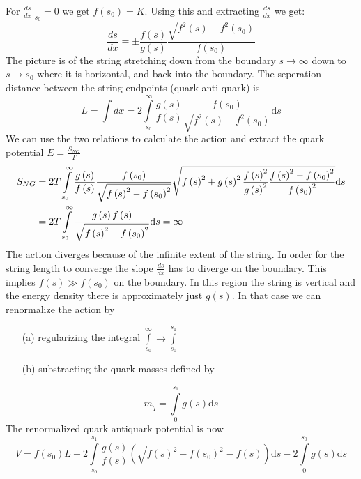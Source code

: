 \documentclass[11pt,a4paper]{article}
\begin{document}
For $\frac{ds}{dx}|_{s_0}=0$ we get $f\left(s_0\right)=K$. Using this and extracting $\frac{ds}{dx}$ we get:
\begin{equation}
\frac{ds}{dx}=\pm\frac{f\left(s\right)}{g\left(s\right)} \frac{\sqrt{f^2\left(s\right)-f^2\left(s_0\right)}}{f\left(s_0\right)}
\end{equation}
The picture is of the string stretching down from the boundary $s\rightarrow\infty$ down to $s\rightarrow s_0$ where it is horizontal, and back into the boundary. The seperation distance between the string endpoints (quark anti quark) is
\begin{equation}
\label{eq:stringseperation}
L=\int dx=2\int\limits_{s_0}^{\infty} \frac{g\left(s\right)}{f\left(s\right)} \frac{f\left(s_0\right)}{\sqrt{f^2\left(s\right)-f^2\left(s_0\right)}} \mathrm{d}s
\end{equation}
We can use the two relations to calculate the action and extract the quark potential $E=\frac{S_{NG}}{T}$
\begin{align}
S_{NG}&=2T\int\limits_{s_0}^{\infty} \frac{g\left(s\right)}{f\left(s\right)} \frac{f\left(s_0\right)}{\sqrt{f\left(s\right)^2-f\left(s_0\right)^2}} \sqrt{f\left(s\right)^2+g\left(s\right)^2\frac{f\left(s\right)^2}{g\left(s\right)^2} \frac{f\left(s\right)^2-f\left(s_0\right)^2}{f\left(s_0\right)^2}}\mathrm{d}s \notag \\
&=2T\int\limits_{s_0}^{\infty} \frac{g\left(s\right)f\left(s\right)}{\sqrt{f\left(s\right)^2-f\left(s_0\right)^2}}\mathrm{d}s=\infty
\end{align}
The action diverges because of the infinite extent of the string. In order for the string length to converge the slope $\frac{ds}{dx}$ has to diverge on the boundary. This implies $f\left(s\right)\gg f\left(s_0\right)$ on the boundary. In this region the string is vertical and the energy density there is approximately just $g\left(s\right)$. In that case we can renormalize the action by
\begin{itemize}
\item[(a)] regularizing the integral $\int\limits_{s_0}^{\infty} \rightarrow \int\limits_{s_0}^{s_1}$
\item[(b)] substracting the quark masses defined by
\end{itemize}
\begin{equation}
m_q=\int\limits_{0}^{s_1}g\left(s\right)\mathrm{d}s
\end{equation}
The renormalized quark antiquark potential is now
\begin{equation}
V=f\left(s_0\right)L+2\int\limits_{s_0}^{s_1} \frac{g\left(s\right)}{f\left(s\right)}\left(\sqrt{f\left(s\right)^2-f\left(s_0\right)^2}-f\left(s\right)\right)\mathrm{d}s-2\int\limits_{0}^{s_0}g\left(s\right)\mathrm{d}s
\end{equation}
\end{document}
